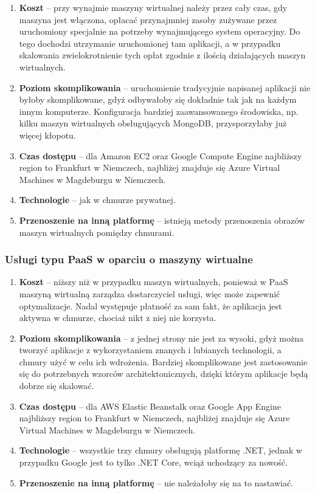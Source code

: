 \documentclass[12pt,a4paper,twoside,titlepage,openright]{book}
\begin{document}
\begin{enumerate}
	\item \textbf{Koszt} -- przy wynajmie maszyny wirtualnej należy przez cały czas, gdy maszyna jest włączona, opłacać przynajmniej zasoby zużywane przez uruchomiony specjalnie na potrzeby wynajmującego system operacyjny. Do tego dochodzi utrzymanie uruchomionej tam aplikacji, a w przypadku skalowania zwielokrotnienie tych opłat zgodnie z ilością działających maszyn wirtualnych.
	\item \textbf{Poziom skomplikowania} -- uruchomienie tradycyjnie napisanej aplikacji nie byłoby skomplikowane, gdyż odbywałoby się dokładnie tak jak na każdym innym komputerze. Konfiguracja bardziej zaawansowanego środowiska, np. kilku maszyn wirtualnych obsługujących MongoDB, przysporzyłaby już więcej kłopotu.
	\item \textbf{Czas dostępu} -- dla Amazon EC2 oraz Google Compute Engine najbliższy region to Frankfurt w Niemczech, najbliżej znajduje się Azure Virtual Machines w Magdeburgu w Niemczech.
	\item \textbf{Technologie} -- jak w chmurze prywatnej.
	\item \textbf{Przenoszenie na inną platformę} -- istnieją metody przenoszenia obrazów maszyn wirtualnych pomiędzy chmurami.
\end{enumerate}


\subsubsection{Usługi typu PaaS w oparciu o maszyny wirtualne}

\begin{enumerate}
	\item \textbf{Koszt} -- niższy niż w przypadku maszyn wirtualnych, ponieważ w PaaS maszyną wirtualną zarządza dostarczyciel usługi, więc może zapewnić optymalizacje. Nadal występuje płatność za sam fakt, że aplikacja jest aktywna w chmurze, chociaż nikt z niej nie korzysta.
	\item \textbf{Poziom skomplikowania} -- z jednej strony nie jest za wysoki, gdyż można tworzyć aplikacje z wykorzystaniem znanych i lubianych technologii, a chmury użyć w celu ich wdrożenia. Bardziej skomplikowane jest zastosowanie się do potrzebnych wzorców architektonicznych, dzięki którym aplikacje będą dobrze się skalować.
	\item \textbf{Czas dostępu} -- dla AWS Elastic Beanstalk oraz Google App Engine najbliższy region to Frankfurt w Niemczech, najbliżej znajduje się Azure Virtual Machines w Magdeburgu w Niemczech.
	\item \textbf{Technologie} -- wszystkie trzy chmury obsługują platformę .NET, jednak w przypadku Google jest to tylko .NET Core, wciąż uchodzący za nowość.
	\item \textbf{Przenoszenie na inną platformę} -- nie należałoby się na to nastawiać.
\end{enumerate}
\end{document}

